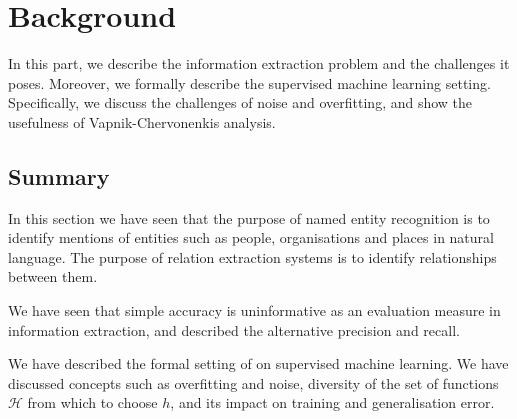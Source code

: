 \chapter{Background}
\label{background}

In this part, we describe the information extraction problem and the challenges it poses. Moreover, we formally describe the supervised machine learning setting. Specifically, we discuss the challenges of noise and overfitting, and show the usefulness of Vapnik-Chervonenkis analysis.




\section{Summary}
In this section we have seen that the purpose of named entity recognition is to identify mentions of entities such as people, organisations and places in natural language. The purpose of relation extraction systems is to identify relationships between them. 

We have seen that simple accuracy is uninformative as an evaluation measure in information extraction, and described the alternative precision and recall.

We have described the formal setting of on supervised machine learning. We have discussed concepts such as overfitting and noise, diversity of the set of functions $\mathcal{H}$ from which to choose $h$, and its impact on training and generalisation error.
